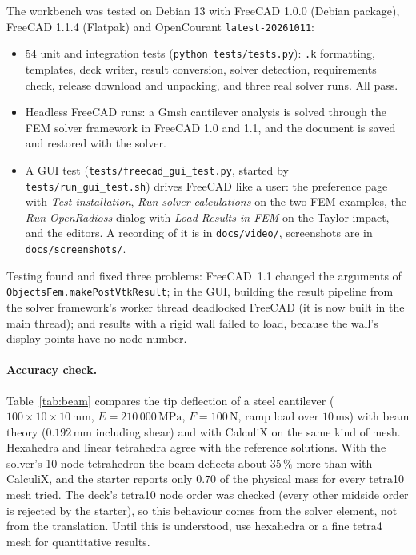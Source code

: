 \documentclass[11pt,a4paper]{article}
\newcommand{\unit}[1]{\,\mathrm{#1}}
\begin{document}
The workbench was tested on Debian 13 with FreeCAD 1.0.0 (Debian package), FreeCAD 1.1.4 (Flatpak)
and OpenCourant \texttt{latest-20261011}:
\begin{itemize}
  \item 54 unit and integration tests (\texttt{python tests/tests.py}): \texttt{.k} formatting,
        templates, deck writer, result conversion, solver detection, requirements check, release
        download and unpacking, and three real solver runs. All pass.
  \item Headless FreeCAD runs: a Gmsh cantilever analysis is solved through the FEM solver
        framework in FreeCAD 1.0 and 1.1, and the document is saved and restored with the solver.
  \item A GUI test (\texttt{tests/freecad\_gui\_test.py}, started by \texttt{tests/run\_gui\_test.sh})
        drives FreeCAD like a user: the preference page with \emph{Test installation},
        \emph{Run solver calculations} on the two FEM examples, the \emph{Run OpenRadioss} dialog with
        \emph{Load Results in FEM} on the Taylor impact, and the editors. A recording of it is in
        \texttt{docs/video/}, screenshots are in \texttt{docs/screenshots/}.
\end{itemize}
Testing found and fixed three problems: FreeCAD~1.1 changed the arguments of
\texttt{ObjectsFem\allowbreak.makePostVtkResult}; in the GUI, building the result pipeline from the
solver framework's worker thread deadlocked FreeCAD (it is now built in the main thread); and
results with a rigid wall failed to load, because the wall's display points have no node number.

\paragraph{Accuracy check.}
Table~\ref{tab:beam} compares the tip deflection of a steel cantilever
($100\times10\times10\unit{mm}$, $E=210\,000\unit{MPa}$, $F=100\unit{N}$, ramp load over
$10\unit{ms}$) with beam theory ($0.192\unit{mm}$ including shear) and with CalculiX on the same
kind of mesh. Hexahedra and linear tetrahedra agree with the reference solutions. With the
solver's 10-node tetrahedron the beam deflects about $35\,\%$ more than with CalculiX, and the
starter reports only $0.70$ of the physical mass for every tetra10 mesh tried. The deck's tetra10 node order was checked
(every other midside order is rejected by the starter), so this behaviour comes from the solver
element, not from the translation. Until this is understood, use hexahedra or a fine tetra4 mesh
for quantitative results.
\end{document}
